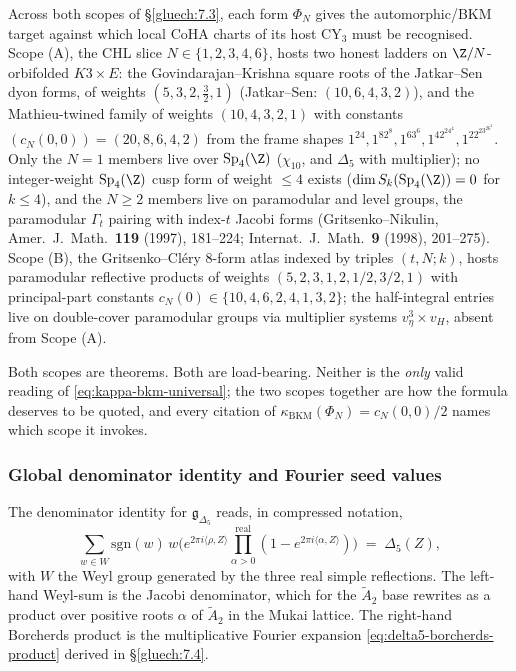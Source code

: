Across both scopes of \S\ref{gluech:7.3}, each form $\Phi_N$ gives the automorphic/BKM target against which local CoHA charts of its host CY$_3$ must be recognised. Scope (A), the CHL slice $N \in \{1, 2, 3, 4, 6\}$, hosts two honest ladders on $\Z/N$-orbifolded $K3 \times E$: the Govindarajan--Krishna square roots of the Jatkar--Sen dyon forms, of weights $(5, 3, 2, \tfrac32, 1)$ (Jatkar--Sen: $(10, 6, 4, 3, 2)$), and the Mathieu-twined family of weights $(10, 4, 3, 2, 1)$ with constants $(c_N(0, 0)) = (20, 8, 6, 4, 2)$ from the frame shapes $1^{24}, 1^82^8, 1^63^6, 1^42^24^4, 1^22^23^26^2$. Only the $N = 1$ members live over $\mathrm{Sp}_4(\Z)$ ($\chi_{10}$, and $\Delta_5$ with multiplier); no integer-weight $\mathrm{Sp}_4(\Z)$ cusp form of weight $\leq 4$ exists ($\dim S_k(\mathrm{Sp}_4(\Z)) = 0$ for $k \leq 4$), and the $N \geq 2$ members live on paramodular and level groups, the paramodular $\Gamma_t$ pairing with index-$t$ Jacobi forms (Gritsenko--Nikulin, Amer.~J.~Math.~\textbf{119} (1997), 181--224; Internat.~J.~Math.~\textbf{9} (1998), 201--275). Scope (B), the Gritsenko--Cl\'ery 8-form atlas indexed by triples $(t, N; k)$, hosts paramodular reflective products of weights $(5, 2, 3, 1, 2, 1/2, 3/2, 1)$ with principal-part constants $c_N(0) \in \{10, 4, 6, 2, 4, 1, 3, 2\}$; the half-integral entries live on double-cover paramodular groups via multiplier systems $v_\eta^3 \times v_H$, absent from Scope (A).

Both scopes are theorems. Both are load-bearing. Neither is the \emph{only} valid reading of \eqref{eq:kappa-bkm-universal}; the two scopes together are how the formula deserves to be quoted, and every citation of $\kappa_{\mathrm{BKM}}(\Phi_N) = c_N(0, 0)/2$ names which scope it invokes.

\subsubsection{Global denominator identity and Fourier seed values}

The denominator identity for $\mathfrak g_{\Delta_5}$ reads, in compressed notation,
\[
 \sum_{w \in W} \mathrm{sgn}(w) \, w\bigl(e^{2\pi i \langle \rho, Z\rangle} \prod_{\alpha > 0}^{\mathrm{real}}(1 - e^{2\pi i \langle \alpha, Z\rangle})\bigr)
 \;=\; \Delta_5(Z),
\]
with $W$ the Weyl group generated by the three real simple reflections. The left-hand Weyl-sum is the Jacobi denominator, which for the $\widetilde A_2$ base rewrites as a product over positive roots $\alpha$ of $\widetilde A_2$ in the Mukai lattice. The right-hand Borcherds product is the multiplicative Fourier expansion \eqref{eq:delta5-borcherds-product} derived in \S\ref{gluech:7.4}.

